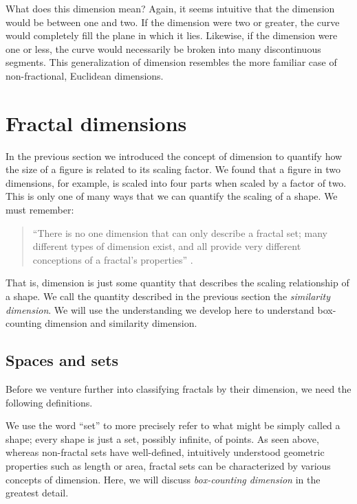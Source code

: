 \begin{myremark}What does this dimension mean? Again, it seems intuitive that the dimension would be between one and two. If the dimension were two or greater, the curve would completely fill the plane in which it lies. Likewise, if the dimension were one or less, the curve would necessarily be broken into many discontinuous segments. This generalization of dimension resembles the more familiar case of non-fractional, Euclidean dimensions. \end{myremark}

\section{Fractal dimensions}
In the previous section we introduced the concept of dimension to quantify how the size of a figure is related to its scaling factor. We found that a figure in two dimensions, for example, is scaled into four parts when scaled by a factor of two. This is only one of many ways that we can quantify the scaling of a shape. We must remember:

\begin{quote}
``There is no one dimension that can only describe a fractal set; many different types of dimension exist, and all provide very different conceptions of a fractal's properties'' \citep{fractaltextbook}.
\end{quote}

That is, dimension is just some quantity that describes the scaling relationship of a shape. We call the quantity described in the previous section the \emph{similarity dimension}. We will use the understanding we develop here to understand box-counting dimension and similarity dimension.

\subsection{Spaces and sets}
Before we venture further into classifying fractals by their dimension, we need the following definitions.

We use the word ``set'' to more precisely refer to what might be simply called a shape; every shape is just a set, possibly infinite, of points. As seen above, whereas non-fractal sets have well-defined, intuitively understood geometric properties such as length or area, fractal sets can be characterized by various concepts of dimension. Here, we will discuss \textit{box-counting dimension} in the greatest detail.



